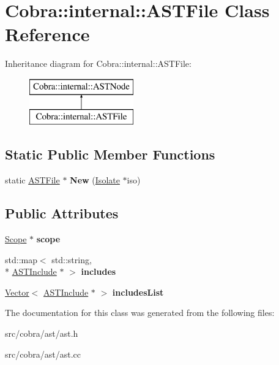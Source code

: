 \hypertarget{class_cobra_1_1internal_1_1_a_s_t_file}{\section{Cobra\+:\+:internal\+:\+:A\+S\+T\+File Class Reference}
\label{class_cobra_1_1internal_1_1_a_s_t_file}
}
Inheritance diagram for Cobra\+:\+:internal\+:\+:A\+S\+T\+File\+:\begin{figure}[H]
\begin{center}
\leavevmode
\includegraphics[height=2.000000cm]{class_cobra_1_1internal_1_1_a_s_t_file}
\end{center}
\end{figure}
\subsection*{Static Public Member Functions}
\begin{DoxyCompactItemize}
\item 
\hypertarget{class_cobra_1_1internal_1_1_a_s_t_file_a3d6b9a72c780f92ed43fdd7d1ac427e1}{static \hyperlink{class_cobra_1_1internal_1_1_a_s_t_file}{A\+S\+T\+File} $\ast$ {\bfseries New} (\hyperlink{class_cobra_1_1internal_1_1_isolate}{Isolate} $\ast$iso)}\label{class_cobra_1_1internal_1_1_a_s_t_file_a3d6b9a72c780f92ed43fdd7d1ac427e1}

\end{DoxyCompactItemize}
\subsection*{Public Attributes}
\begin{DoxyCompactItemize}
\item 
\hypertarget{class_cobra_1_1internal_1_1_a_s_t_file_affc71f3bf233586e51d4c5b0aa938962}{\hyperlink{class_cobra_1_1internal_1_1_scope}{Scope} $\ast$ {\bfseries scope}}\label{class_cobra_1_1internal_1_1_a_s_t_file_affc71f3bf233586e51d4c5b0aa938962}

\item 
\hypertarget{class_cobra_1_1internal_1_1_a_s_t_file_a42894264a73763f348dbf5b5040a55cd}{std\+::map$<$ std\+::string, \\*
\hyperlink{class_cobra_1_1internal_1_1_a_s_t_include}{A\+S\+T\+Include} $\ast$ $>$ {\bfseries includes}}\label{class_cobra_1_1internal_1_1_a_s_t_file_a42894264a73763f348dbf5b5040a55cd}

\item 
\hypertarget{class_cobra_1_1internal_1_1_a_s_t_file_a656ac21ce841e5d53763d45573fa938e}{\hyperlink{class_cobra_1_1internal_1_1_vector}{Vector}$<$ \hyperlink{class_cobra_1_1internal_1_1_a_s_t_include}{A\+S\+T\+Include} $\ast$ $>$ {\bfseries includes\+List}}\label{class_cobra_1_1internal_1_1_a_s_t_file_a656ac21ce841e5d53763d45573fa938e}

\end{DoxyCompactItemize}


The documentation for this class was generated from the following files\+:\begin{DoxyCompactItemize}
\item 
src/cobra/ast/ast.\+h\item 
src/cobra/ast/ast.\+cc\end{DoxyCompactItemize}
